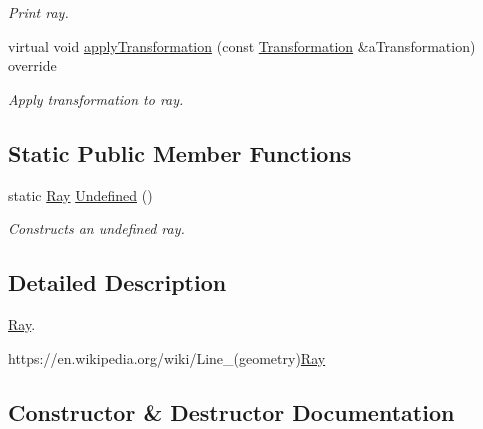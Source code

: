 \begin{DoxyCompactItemize}
\begin{DoxyCompactList}\small\item\em Print ray. \end{DoxyCompactList}\item 
virtual void \hyperlink{classlibrary_1_1math_1_1geom_1_1d3_1_1objects_1_1_ray_a0dd177a924978e1817a9fa888594e694}{apply\+Transformation} (const \hyperlink{classlibrary_1_1math_1_1geom_1_1d3_1_1_transformation}{Transformation} \&a\+Transformation) override
\begin{DoxyCompactList}\small\item\em Apply transformation to ray. \end{DoxyCompactList}\end{DoxyCompactItemize}
\subsection*{Static Public Member Functions}
\begin{DoxyCompactItemize}
\item 
static \hyperlink{classlibrary_1_1math_1_1geom_1_1d3_1_1objects_1_1_ray}{Ray} \hyperlink{classlibrary_1_1math_1_1geom_1_1d3_1_1objects_1_1_ray_abf40bfaeab9e9024fd1fc73893da09e0}{Undefined} ()
\begin{DoxyCompactList}\small\item\em Constructs an undefined ray. \end{DoxyCompactList}\end{DoxyCompactItemize}


\subsection{Detailed Description}
\hyperlink{classlibrary_1_1math_1_1geom_1_1d3_1_1objects_1_1_ray}{Ray}. 

https\+://en.wikipedia.\+org/wiki/\+Line\+\_\+(geometry)\hyperlink{classlibrary_1_1math_1_1geom_1_1d3_1_1objects_1_1_ray_a11b7613464daaebc6e25a758b057f203}{Ray} 

\subsection{Constructor \& Destructor Documentation}
\mbox{\label{classlibrary_1_1math_1_1geom_1_1d3_1_1objects_1_1_ray_a11b7613464daaebc6e25a758b057f203}} 
